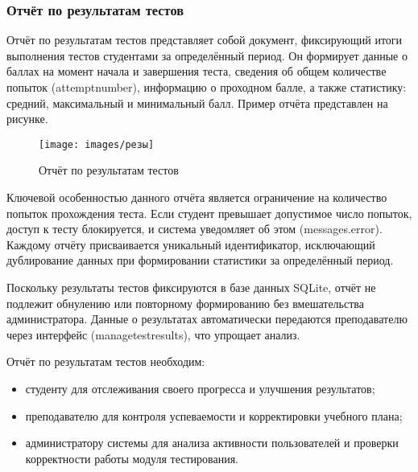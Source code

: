 \subsubsection{Отчёт по результатам тестов}
Отчёт по результатам тестов представляет собой документ, фиксирующий итоги выполнения тестов студентами за определённый период. Он формирует данные о баллах на момент начала и завершения теста, сведения об общем количестве попыток (attemptnumber), информацию о проходном балле, а также статистику: средний, максимальный и минимальный балл. Пример отчёта представлен на рисунке. 

\begin{figure}[ht]
	\centering
	\texttt{[image: images/резы]} 
	\caption{Отчёт по результатам тестов}
	\label{zotchet:image}
\end{figure}

Ключевой особенностью данного отчёта является ограничение на количество попыток прохождения теста. Если студент превышает допустимое число попыток, доступ к тесту блокируется, и система уведомляет об этом (messages.error). Каждому отчёту присваивается уникальный идентификатор, исключающий дублирование данных при формировании статистики за определённый период.

Поскольку результаты тестов фиксируются в базе данных SQLite, отчёт не подлежит обнулению или повторному формированию без вмешательства администратора. Данные о результатах автоматически передаются преподавателю через интерфейс (managetestresults), что упрощает анализ. 

Отчёт по результатам тестов необходим: 

\begin{itemize}
	\item студенту для отслеживания своего прогресса и улучшения результатов; 
	\item преподавателю для контроля успеваемости и корректировки учебного плана; 
	\item администратору системы для анализа активности пользователей и проверки корректности работы модуля тестирования.
\end{itemize}

